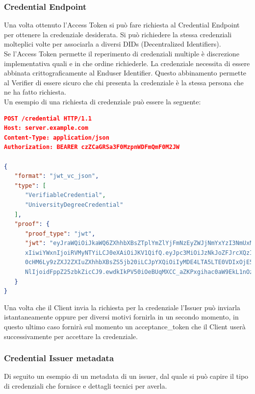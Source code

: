 \subsubsection{Credential Endpoint}
Una volta ottenuto l'Access Token si può fare richiesta al Credential Endpoint per ottenere la credenziale desiderata.
Si può richiedere la stessa credenziali molteplici volte per associarla a diversi DIDs (Decentralized Identifiers).
\\Se l'Access Token permette il reperimento di credenziali multiple è discrezione implementativa quali e in che ordine richiederle.
La credenziale necessita di essere abbinata crittograficamente al Enduser Identifier.
Questo abbinamento permette al Verifier di essere sicuro che chi presenta la credenziale è la stessa persona che ne ha fatto richiesta.
\\Un esempio di una richiesta di credenziale può essere la seguente:
\begin{lstlisting}[language=json,firstnumber=1]
POST /credential HTTP/1.1
Host: server.example.com
Content-Type: application/json
Authorization: BEARER czZCaGRSa3F0MzpnWDFmQmF0M2JW

{
   "format": "jwt_vc_json",
   "type": [
      "VerifiableCredential",
      "UniversityDegreeCredential"
   ],
   "proof": {
      "proof_type": "jwt",
      "jwt": "eyJraWQiOiJkaWQ6ZXhhbXBsZTplYmZlYjFmNzEyZWJjNmYxYzI3NmUxMmVjMjEva2V5cy8
      xIiwiYWxnIjoiRVMyNTYiLCJ0eXAiOiJKV1QifQ.eyJpc3MiOiJzNkJoZFJrcXQzIiwiYXVkIjoiaHR
      0cHM6Ly9zZXJ2ZXIuZXhhbXBsZS5jb20iLCJpYXQiOiIyMDE4LTA5LTE0VDIxOjE5OjEwWiIsIm5vbm
      NlIjoidFppZ25zbkZicCJ9.ewdkIkPV50iOeBUqMXCC_aZKPxgihac0aW9EkL1nOzM"
   }
}
\end{lstlisting}

Una volta che il Client invia la richiesta per la credenziale l'Issuer può inviarla istantaneamente oppure per diversi motivi
fornirla in un secondo momento, in questo ultimo caso fornirà sul momento un acceptance\_token che il Client userà successivamente per accettare
la credenziale.

\subsubsection{Credential Issuer metadata}
Di seguito un esempio di un metadata di un issuer, dal quale si può capire il tipo di credenziali che fornisce e dettagli tecnici per averla.

